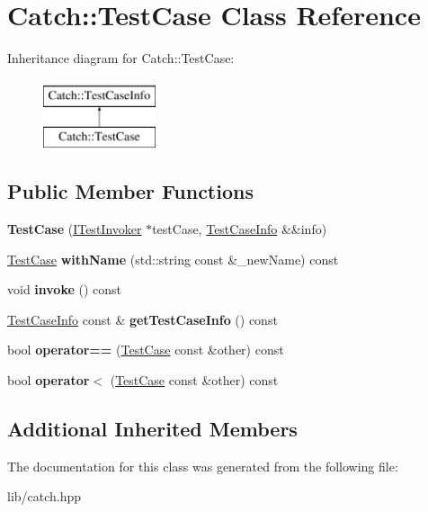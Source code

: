 \hypertarget{class_catch_1_1_test_case}{}\section{Catch\+:\+:Test\+Case Class Reference}
\label{class_catch_1_1_test_case}
Inheritance diagram for Catch\+:\+:Test\+Case\+:\begin{figure}[H]
\begin{center}
\leavevmode
\includegraphics[height=2.000000cm]{class_catch_1_1_test_case}
\end{center}
\end{figure}
\subsection*{Public Member Functions}
\begin{DoxyCompactItemize}
\item 
\mbox{\label{class_catch_1_1_test_case_aae5709fc1cb68e19ab0ac27e1ffd6a76}} 
{\bfseries Test\+Case} (\mbox{\hyperlink{struct_catch_1_1_i_test_invoker}{I\+Test\+Invoker}} $\ast$test\+Case, \mbox{\hyperlink{struct_catch_1_1_test_case_info}{Test\+Case\+Info}} \&\&info)
\item 
\mbox{\label{class_catch_1_1_test_case_a0812e8a216d09b087d5874687009f0d6}} 
\mbox{\hyperlink{class_catch_1_1_test_case}{Test\+Case}} {\bfseries with\+Name} (std\+::string const \&\+\_\+new\+Name) const
\item 
\mbox{\label{class_catch_1_1_test_case_a26f346c8446dded0562fe3818ae71651}} 
void {\bfseries invoke} () const
\item 
\mbox{\label{class_catch_1_1_test_case_a1ea0d79f49156cebea076fe1ba50d2b6}} 
\mbox{\hyperlink{struct_catch_1_1_test_case_info}{Test\+Case\+Info}} const  \& {\bfseries get\+Test\+Case\+Info} () const
\item 
\mbox{\label{class_catch_1_1_test_case_a5456d03a90f75292835c158f3a3374a1}} 
bool {\bfseries operator==} (\mbox{\hyperlink{class_catch_1_1_test_case}{Test\+Case}} const \&other) const
\item 
\mbox{\label{class_catch_1_1_test_case_a030e4b9282e9b32e08c8bd5e5cd6fa98}} 
bool {\bfseries operator$<$} (\mbox{\hyperlink{class_catch_1_1_test_case}{Test\+Case}} const \&other) const
\end{DoxyCompactItemize}
\subsection*{Additional Inherited Members}


The documentation for this class was generated from the following file\+:\begin{DoxyCompactItemize}
\item 
lib/catch.\+hpp\end{DoxyCompactItemize}
